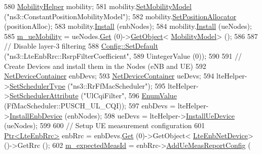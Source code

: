 \begin{DoxyCode}
580   \hyperlink{classns3_1_1MobilityHelper}{MobilityHelper} mobility;
581   mobility.\hyperlink{classns3_1_1MobilityHelper_a030275011b6f40682e70534d30280aba}{SetMobilityModel} (\textcolor{stringliteral}{"ns3::ConstantPositionMobilityModel"});
582   mobility.\hyperlink{classns3_1_1MobilityHelper_ac59d5295076be3cc11021566713a28c5}{SetPositionAllocator} (positionAlloc);
583   mobility.\hyperlink{classns3_1_1MobilityHelper_a07737960ee95c0777109cf2994dd97ae}{Install} (enbNodes);
584   mobility.\hyperlink{classns3_1_1MobilityHelper_a07737960ee95c0777109cf2994dd97ae}{Install} (ueNodes);
585   \hyperlink{classLteUeMeasurementsPiecewiseTestCase1_aa80f896fa30885c5f47acc4d3332228b}{m\_ueMobility} = ueNodes.\hyperlink{classns3_1_1NodeContainer_a9ed96e2ecc22e0f5a3d4842eb9bf90bf}{Get} (0)->\hyperlink{classns3_1_1Object_a13e18c00017096c8381eb651d5bd0783}{GetObject}<
      \hyperlink{classns3_1_1MobilityModel}{MobilityModel}> ();
586 
587   \textcolor{comment}{// Disable layer-3 filtering}
588   \hyperlink{group__config_ga2e7882df849d8ba4aaad31c934c40c06}{Config::SetDefault} (\textcolor{stringliteral}{"ns3::LteEnbRrc::RsrpFilterCoefficient"},
589                       UintegerValue (0));
590 
591   \textcolor{comment}{// Create Devices and install them in the Nodes (eNB and UE)}
592   \hyperlink{classns3_1_1NetDeviceContainer}{NetDeviceContainer} enbDevs;
593   \hyperlink{classns3_1_1NetDeviceContainer}{NetDeviceContainer} ueDevs;
594   lteHelper->\hyperlink{classns3_1_1LteHelper_a8f86e55b8b80a81732c4b2df00fb25d5}{SetSchedulerType} (\textcolor{stringliteral}{"ns3::RrFfMacScheduler"});
595   lteHelper->\hyperlink{classns3_1_1LteHelper_a38f8c7f4592b31c0f3dedb53e7909742}{SetSchedulerAttribute} (\textcolor{stringliteral}{"UlCqiFilter"},
596                                     \hyperlink{classns3_1_1EnumValue}{EnumValue} (FfMacScheduler::PUSCH\_UL\_CQI));
597   enbDevs = lteHelper->\hyperlink{classns3_1_1LteHelper_a5e009ad35ef85f46b5a6099263f15a03}{InstallEnbDevice} (enbNodes);
598   ueDevs = lteHelper->\hyperlink{classns3_1_1LteHelper_ac9cd932d7de92811cfa953c2e3b2fc9f}{InstallUeDevice} (ueNodes);
599 
600   \textcolor{comment}{// Setup UE measurement configuration}
601   \hyperlink{classns3_1_1Ptr}{Ptr<LteEnbRrc>} enbRrc = enbDevs.\hyperlink{classns3_1_1NetDeviceContainer_a677d62594b5c9d2dea155cc5045f4d0b}{Get} (0)->GetObject<
      \hyperlink{classns3_1_1LteEnbNetDevice}{LteEnbNetDevice}> ()->GetRrc ();
602   \hyperlink{classLteUeMeasurementsPiecewiseTestCase1_a39095f59bf1a01ce9b08d52ee7b89340}{m\_expectedMeasId} = enbRrc->\hyperlink{classns3_1_1LteEnbRrc_a4b9348b6c39a805cd23d3ed4a5091ae5}{AddUeMeasReportConfig} (

\end{DoxyCode}
